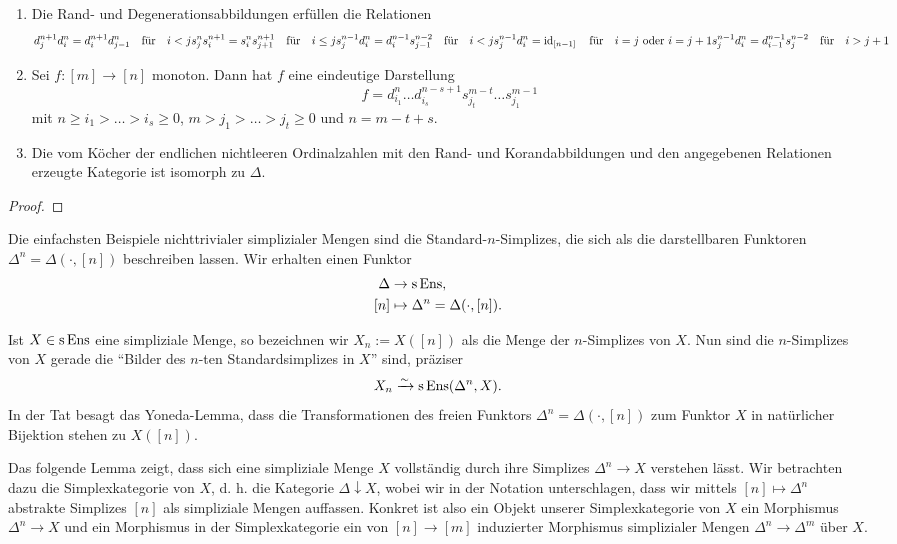 \begin{lemma}[\cite{??}]
  \begin{enumerate}[label=(\roman*)]
  \item Die Rand- und Degenerationsabbildungen erfüllen die Relationen
    \begin{align*}
    d_j^{n+1} d_i^n = d_i^{n+1} d_{j-1}^n \quad \text{für} \quad i < j
    s_j^n s_i^{n+1} = s_i^n s_{j+1}^{n+1} \quad \text{für} \quad i \leq j
    s_j^{n-1} d_i^n = d_i^{n-1} s_{j-1}^{n-2} \quad \text{für} \quad i < j
    s_j^{n-1} d_i^n = \operatorname{id}_{[n-1]} \quad \text{für} \quad i = j \text{ oder } i = j+1
    s_j^{n-1} d_i^n = d_{i-1}^{n-1} s_j^{n-2} \quad \text{für} \quad i > j + 1
    \end{align*}
 
  \item Sei $f: [m] \to [n]$ monoton. Dann hat $f$ eine eindeutige
    Darstellung
    \[ f = d_{i_1}^n \dots d_{i_s}^{n-s+1} s_{j_t}^{m-t} \dots s_{j_1}^{m-1} \]
    mit $n \geq i_1 > \dots > i_s \geq 0$, $m > j_1 > \dots > j_t \geq
    0$ und $n = m-t+s$.
    
  \item Die vom Köcher der endlichen nichtleeren Ordinalzahlen mit den
  Rand- und Korandabbildungen und den angegebenen Relationen erzeugte
  Kategorie ist isomorph zu $\Delta$.
  \end{enumerate}
\end{lemma}
\begin{proof}
\end{proof}


Die einfachsten Beispiele nichttrivialer simplizialer Mengen sind die
Standard-$n$-Simplizes, die sich als die darstellbaren Funktoren
$\Delta^n = \Delta(\cdot, [n])$ beschreiben lassen. Wir erhalten einen
Funktor
\begin{align*}
  \Delta &\to \operatorname{s}\operatorname{Ens}, \\
  [n] &\mapsto \Delta^n = \Delta(\cdot, [n]).
\end{align*}

Ist $X \in \operatorname{s}\operatorname{Ens}$ eine simpliziale Menge, so bezeichnen wir $X_n :=
X([n])$ als die Menge der $n$-Simplizes von $X$. Nun sind die
$n$-Simplizes von $X$ gerade die ``Bilder des $n$-ten
Standardsimplizes in $X$'' sind, präziser
\[ X_n \xrightarrow{\sim} \operatorname{s}\operatorname{Ens}(\Delta^n, X). \]
In der Tat besagt das Yoneda-Lemma, dass die Transformationen des
freien Funktors $\Delta^n = \Delta(\cdot, [n])$ zum Funktor $X$ in
natürlicher Bijektion stehen zu $X([n])$.

Das folgende Lemma zeigt, dass sich eine simpliziale Menge $X$
vollständig durch ihre Simplizes $\Delta^n \to X$ verstehen lässt.
Wir betrachten dazu die Simplexkategorie von $X$, d. h. die Kategorie
$\Delta \downarrow X$, wobei wir in der Notation unterschlagen, dass
wir mittels $[n] \mapsto \Delta^n$ abstrakte Simplizes $[n]$ als
simpliziale Mengen auffassen. Konkret ist also ein Objekt unserer
Simplexkategorie von $X$ ein Morphismus $\Delta^n \to X$ und ein
Morphismus in der Simplexkategorie ein von $[n] \to [m]$ induzierter
Morphismus simplizialer Mengen $\Delta^n \to \Delta^m$ über $X$.

